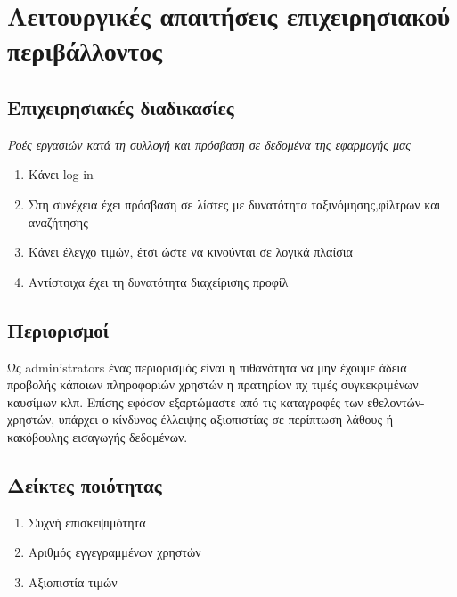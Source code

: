\section{Λειτουργικές απαιτήσεις επιχειρησιακού περιβάλλοντος}



\subsection{Επιχειρησιακές διαδικασίες}
\textit{Ροές εργασιών κατά τη συλλογή και πρόσβαση σε δεδομένα της εφαρμογής μας}


\begin{enumerate}
	\item Κάνει log in
	\item Στη συνέχεια έχει πρόσβαση σε λίστες με δυνατότητα ταξινόμησης,φίλτρων και αναζήτησης
	\item Κάνει έλεγχο τιμών, έτσι ώστε να κινούνται σε λογικά πλαίσια
	\item Αντίστοιχα έχει τη δυνατότητα διαχείρισης προφίλ
\end{enumerate}



\subsection{Περιορισμοί}
Ως administrators ένας περιορισμός είναι η πιθανότητα να μην έχουμε άδεια προβολής κάποιων πληροφοριών χρηστών η πρατηρίων πχ τιμές συγκεκριμένων καυσίμων κλπ. Επίσης εφόσον εξαρτώμαστε από τις καταγραφές των εθελοντών-χρηστών, υπάρχει ο κίνδυνος έλλειψης αξιοπιστίας σε περίπτωση λάθους ή κακόβουλης εισαγωγής δεδομένων.


\subsection{Δείκτες ποιότητας}
\begin{enumerate}
	\item Συχνή επισκεψιμότητα
	\item Αριθμός εγγεγραμμένων χρηστών 
	\item Αξιοπιστία τιμών
\end{enumerate}
